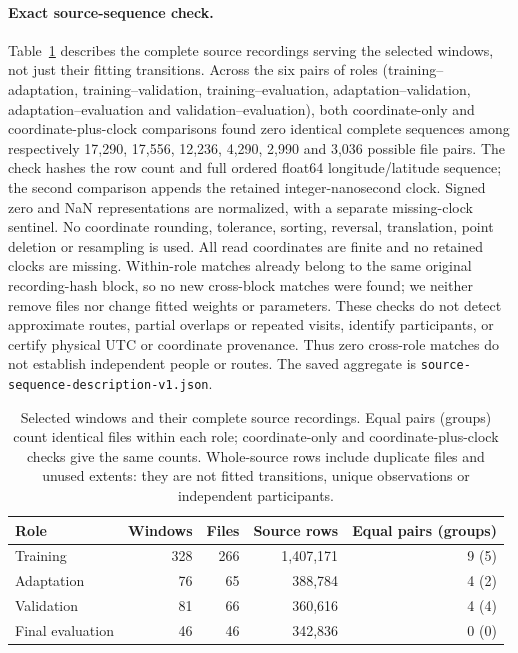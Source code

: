 \paragraph{Exact source-sequence check.}\label{sec:source-sequence-screen}\hypertarget{sec:source-sequence-screen}{}
Table~\ref{tab:source-sequence-screen} describes the complete source recordings
serving the selected windows, not just their fitting transitions. Across the
six pairs of roles (training--adaptation, training--validation,
training--evaluation, adaptation--validation, adaptation--evaluation and
validation--evaluation), both coordinate-only and coordinate-plus-clock
comparisons found zero identical complete sequences among respectively
17,290, 17,556, 12,236, 4,290, 2,990 and 3,036 possible file pairs.
The check hashes the row count and full ordered float64 longitude/latitude
sequence; the second comparison appends the retained integer-nanosecond clock.
Signed zero and NaN representations are normalized, with a separate missing-clock
sentinel. No coordinate rounding, tolerance, sorting, reversal, translation,
point deletion or resampling is used. All read coordinates are finite and no
retained clocks are missing. Within-role matches already belong to the same
original recording-hash block, so no new cross-block matches were found;
we neither remove files nor change fitted weights or parameters.
These checks do not detect approximate routes, partial overlaps or repeated
visits, identify participants, or certify physical UTC or coordinate provenance.
Thus zero cross-role matches do not establish independent people or routes.
The saved aggregate is \texttt{source-sequence-description-v1.json}.

\begin{table}[htbp]
\centering\small
\caption{Selected windows and their complete source recordings. Equal pairs
(groups) count identical files within each role; coordinate-only and
coordinate-plus-clock checks give the same counts. Whole-source rows include
duplicate files and unused extents: they are not fitted transitions, unique
observations or independent participants.}
\label{tab:source-sequence-screen}\hypertarget{tab:source-sequence-screen}{}
\begin{tabular}{@{}lrrrr@{}}
\toprule
Role & Windows & Files & Source rows & Equal pairs (groups)\\
\midrule
Training & 328 & 266 & 1,407,171 & 9 (5)\\
Adaptation & 76 & 65 & 388,784 & 4 (2)\\
Validation & 81 & 66 & 360,616 & 4 (4)\\
Final evaluation & 46 & 46 & 342,836 & 0 (0)\\
\bottomrule
\end{tabular}
\end{table}

